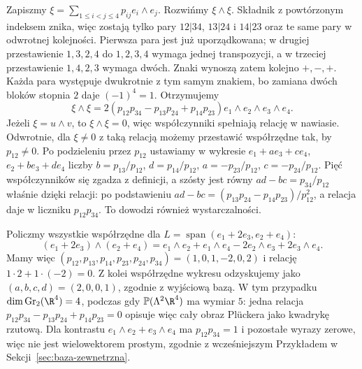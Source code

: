 \begin{przyklad}
Zapiszmy $\xi=\sum_{1\leq i<j\leq4}p_{ij}e_i\wedge e_j$.
Rozwińmy $\xi\wedge\xi$. Składnik z powtórzonym
indeksem znika, więc zostają tylko pary $12|34$, $13|24$
i $14|23$ oraz te same pary w odwrotnej kolejności.
Pierwsza para jest już uporządkowana; w drugiej
przestawienie $1,3,2,4$ do $1,2,3,4$ wymaga jednej
transpozycji, a w trzeciej przestawienie $1,4,2,3$
wymaga dwóch. Znaki wynoszą zatem kolejno $+,-,+$.
Każda para występuje dwukrotnie z tym samym znakiem,
bo zamiana dwóch bloków stopnia $2$ daje $(-1)^4=1$.
Otrzymujemy
\begin{equation}\label{eq:plucker-24}
 \xi\wedge\xi=
 2(p_{12}p_{34}-p_{13}p_{24}+p_{14}p_{23})
   e_1\wedge e_2\wedge e_3\wedge e_4.
\end{equation}
Jeżeli $\xi=u\wedge v$, to $\xi\wedge\xi=0$,
więc współczynniki spełniają relację w nawiasie.
Odwrotnie, dla $\xi\ne0$ z taką relacją możemy
przestawić współrzędne tak, by $p_{12}\ne0$.
Po podzieleniu przez $p_{12}$ ustawiamy w wykresie
$e_1+ae_3+ce_4$, $e_2+be_3+de_4$ liczby
$b=p_{13}/p_{12}$, $d=p_{14}/p_{12}$,
$a=-p_{23}/p_{12}$, $c=-p_{24}/p_{12}$.
Pięć współczynników się zgadza z definicji,
a szósty jest równy $ad-bc=p_{34}/p_{12}$
właśnie dzięki relacji: po podstawieniu
$ad-bc=(p_{13}p_{24}-p_{14}p_{23})/p_{12}^2$,
a relacja daje w liczniku $p_{12}p_{34}$.
To dowodzi również
wystarczalności.

Policzmy wszystkie współrzędne dla
$L=\operatorname{span}(e_1+2e_3,e_2+e_4)$:
\[
 (e_1+2e_3)\wedge(e_2+e_4)
  =e_1\wedge e_2+e_1\wedge e_4
   -2e_2\wedge e_3+2e_3\wedge e_4.
\]
Mamy więc $(p_{12},p_{13},p_{14},p_{23},p_{24},p_{34})
=(1,0,1,-2,0,2)$ i relację $1\cdot2+1\cdot(-2)=0$.
Z kolei współrzędne wykresu odzyskujemy jako
$(a,b,c,d)=(2,0,0,1)$, zgodnie z wyjściową bazą.
W tym przypadku $\dim\operatorname{Gr}_2(\R^4)=4$,
podczas gdy $\mathbb P(\Lambda^2\R^4)$ ma wymiar $5$:
jedna relacja $p_{12}p_{34}-p_{13}p_{24}+p_{14}p_{23}=0$
opisuje więc cały obraz Plückera jako kwadrykę rzutową.
Dla kontrastu
$e_1\wedge e_2+e_3\wedge e_4$ ma
$p_{12}p_{34}=1$ i pozostałe wyrazy zerowe,
więc nie jest wielowektorem prostym, zgodnie
z wcześniejszym Przykładem w
Sekcji~\ref{sec:baza-zewnetrzna}.
\end{przyklad}

